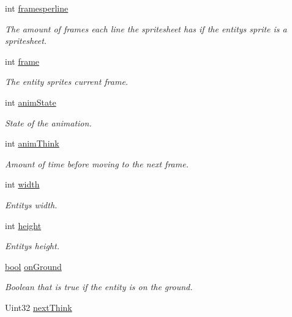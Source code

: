 \begin{DoxyCompactItemize}
int \hyperlink{structentity__s_a090538eaf48f495a735294df148c1ce7}{framesperline}
\begin{DoxyCompactList}\small\item\em The amount of frames each line the spritesheet has if the entity\textquotesingle{}s sprite is a spritesheet. \end{DoxyCompactList}\item 
int \hyperlink{structentity__s_ad30f972f2e6e3e5ecab0dee38ae6cdb8}{frame}
\begin{DoxyCompactList}\small\item\em The entity sprite\textquotesingle{}s current frame. \end{DoxyCompactList}\item 
int \hyperlink{structentity__s_a1243efedb746d6c3b56bea6b10d3c851}{anim\+State}
\begin{DoxyCompactList}\small\item\em State of the animation. \end{DoxyCompactList}\item 
int \hyperlink{structentity__s_af71c7e5e99c44ec4a2ee923a848e718b}{anim\+Think}
\begin{DoxyCompactList}\small\item\em Amount of time before moving to the next frame. \end{DoxyCompactList}\item 
int \hyperlink{structentity__s_a2474a5474cbff19523a51eb1de01cda4}{width}
\begin{DoxyCompactList}\small\item\em Entity\textquotesingle{}s width. \end{DoxyCompactList}\item 
int \hyperlink{structentity__s_ad12fc34ce789bce6c8a05d8a17138534}{height}
\begin{DoxyCompactList}\small\item\em Entity\textquotesingle{}s height. \end{DoxyCompactList}\item 
\hyperlink{boolean_8h_abb452686968e48b67397da5f97445f5b}{bool} \hyperlink{structentity__s_afcbf95c3f0a20a7d68c5d9a241853c66}{on\+Ground}
\begin{DoxyCompactList}\small\item\em Boolean that is true if the entity is on the ground. \end{DoxyCompactList}\item 
Uint32 \hyperlink{structentity__s_a135cb0ebb9e7e91c5de82eaa033e4c60}{next\+Think}

\end{DoxyCompactItemize}
